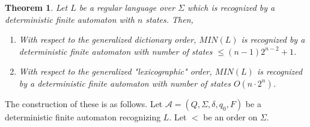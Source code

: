 \documentclass[a4paper,12pt]{article}
\theoremstyle{break}
\newtheorem{theorem}{Theorem}[subsection]
\begin{document}
\begin{theorem}
    Let $L$ be a regular language over $\Sigma$ which is recognized by a deterministic 
    finite automaton with $n$ states. Then,

    \begin{enumerate}
        \item With respect to the generalized dictionary order, $MIN(L)$ is recognized by a deterministic finite automaton with number of states $\leq (n-1)2^{n-2}+1$.
        \item With respect to the generalized "lexicographic" order, $MIN(L)$ is recognized by a deterministic finite automaton with number of states $O(n\cdot 2^n)$.      
    \end{enumerate}
\end{theorem}

The construction of these is as follows. Let $\mathcal{A}=(Q,\Sigma,\delta,q_0,F)$ be a deterministic finite automaton recognizing $L$. Let $<$ be an order on $\Sigma$.
\end{document}

